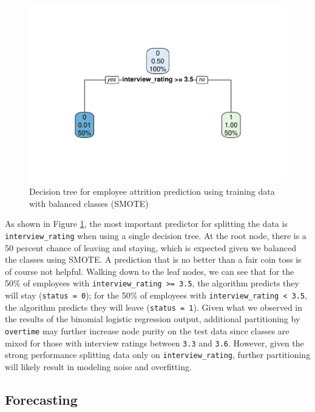 \documentclass[
]{book}
\begin{document}
\begin{figure}

{\centering \includegraphics[width=0.75\linewidth]{The_Fundamentals_of_People_Analytics_files/figure-latex/rpart-tree-1} 

}

\caption{Decision tree for employee attrition prediction using training data with balanced classes (SMOTE)}\label{fig:rpart-tree}
\end{figure}

As shown in Figure \ref{fig:rpart-tree}, the most important predictor for splitting the data is \texttt{interview\_rating} when using a single decision tree. At the root node, there is a 50 percent chance of leaving and staying, which is expected given we balanced the classes using SMOTE. A prediction that is no better than a fair coin toss is of course not helpful. Walking down to the leaf nodes, we can see that for the 50\% of employees with \texttt{interview\_rating\ \textgreater{}=\ 3.5}, the algorithm predicts they will stay (\texttt{status\ =\ 0}); for the 50\% of employees with \texttt{interview\_rating\ \textless{}\ 3.5}, the algorithm predicts they will leave (\texttt{status\ =\ 1}). Given what we observed in the results of the binomial logistic regression output, additional partitioning by \texttt{overtime} may further increase node purity on the test data since classes are mixed for those with interview ratings between \texttt{3.3} and \texttt{3.6}. However, given the strong performance splitting data only on \texttt{interview\_rating}, further partitioning will likely result in modeling noise and overfitting.

\hypertarget{forecasting}{%
\subsection{Forecasting}\label{forecasting}}
\end{document}
